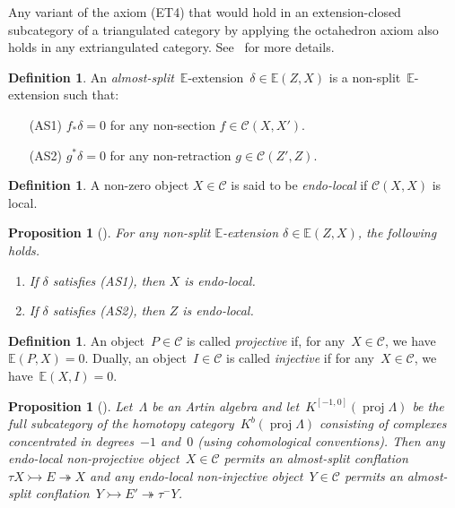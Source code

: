 \documentclass{amsart}
\newtheorem{proposition}[theorem]{Proposition}
\theoremstyle{definition}
\newtheorem{definition}[theorem]{Definition}
\newcommand{\darkblue}{\color{darkblue}} %
\newcommand{\defn}[1]{\textsl{\darkblue #1}} %
\newcommand{\cat}{\mathcal{C}}
\newcommand{\proj}{\operatorname{proj}}
\newcommand{\infl}{\rightarrowtail}
\newcommand{\defl}{\twoheadrightarrow}
\begin{document}
Any variant of the axiom (ET4) that would hold in an extension-closed subcategory of a triangulated category by applying the octahedron axiom also holds in any extriangulated category.
See~\cite[Sect.~3.2]{NakaokaPalu} for more details.


\begin{definition}
An \defn{almost-split}~$\mathbb{E}$-extension~$\delta\in\mathbb{E}(Z,X)$ is a non-split~$\mathbb{E}$-extension such that:
\begin{itemize}
\item[{\rm (AS1)}] $f_\ast\delta=0$ for any non-section $f\in\cat(X,X')$.
\item[{\rm (AS2)}] $g^\ast\delta=0$ for any non-retraction $g\in\cat(Z',Z)$.
\end{itemize}
\end{definition}

\begin{definition}
A non-zero object $X\in\cat$ is said to be \defn{endo-local} if $\cat(X,X)$ is local.
\end{definition}

\begin{proposition}[{\cite[Prop.~2.5]{IyamaNakaokaPalu}}]
For any non-split $\mathbb{E}$-extension $\delta\in\mathbb{E}(Z,X)$, the following holds.
\begin{enumerate}
\item If $\delta$ satisfies {\rm (AS1)}, then $X$ is endo-local.
\item If $\delta$ satisfies {\rm (AS2)}, then $Z$ is endo-local.
\end{enumerate}
\end{proposition}

\begin{definition}
 An object~$P\in\cat$ is called \defn{projective} if, for any~$X\in\cat$, we have~$\mathbb{E}(P,X)=0$.
 Dually, an object~$I\in\cat$ is called \defn{injective} if for any~$X\in\cat$, we have~$\mathbb{E}(X,I)=0$.
\end{definition}

\begin{proposition}[{\cite[Prop.~8.1]{IyamaNakaokaPalu}}]
Let~$\Lambda$ be an Artin algebra and let~$K^{[-1,0]}(\proj\Lambda)$ be the full subcategory of the homotopy category~$K^b(\proj\Lambda)$ consisting of complexes concentrated in degrees~$-1$ and~$0$ (using cohomological conventions).
Then any endo-local non-projective object~$X\in\cat$ permits an almost-split conflation~$\tau X\infl E\defl X$ and any endo-local non-injective object~$Y\in\cat$ permits an almost-split conflation~$Y\infl E'\defl \tau^- Y$.
\end{proposition}
\end{document}

